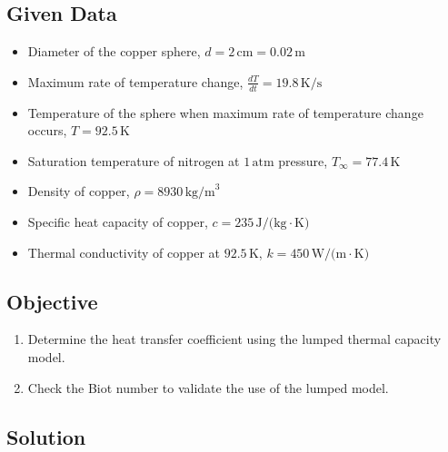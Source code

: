 \documentclass{article}
\numberwithin{equation}{section}
\begin{document}
\subsection*{Given Data}
\begin{itemize}
    \item Diameter of the copper sphere, $d = 2 \, \text{cm} = 0.02 \, \text{m}$
    \item Maximum rate of temperature change, $\frac{dT}{dt} = 19.8 \, \text{K/s}$
    \item Temperature of the sphere when maximum rate of temperature change occurs, $T = 92.5 \, \text{K}$
    \item Saturation temperature of nitrogen at $1 \, \text{atm}$ pressure, $T_{\infty} = 77.4 \, \text{K}$
    \item Density of copper, $\rho = 8930 \, \text{kg/m}^3$
    \item Specific heat capacity of copper, $c = 235 \, \text{J/(kg} \cdot \text{K)}$
    \item Thermal conductivity of copper at $92.5 \, \text{K}$, $k = 450 \, \text{W/(m} \cdot \text{K)}$
\end{itemize}

\subsection*{Objective}
\begin{enumerate}
    \item Determine the heat transfer coefficient using the lumped thermal capacity model.
    \item Check the Biot number to validate the use of the lumped model.
\end{enumerate}

\subsection*{Solution}
\end{document}
